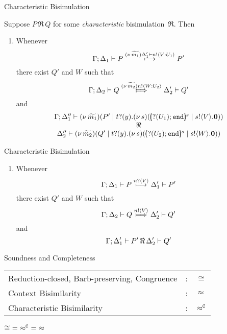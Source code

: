 \documentclass{beamer}
\begin{document}
	\begin{frame}{Characteristic Bisimulation}

		Suppose $P\, \Re\, Q$ for some {\em characteristic} bisimulation~$\Re$. Then
		\begin{enumerate}[$(\star)$]
			\item	Whenever
				\[
					\Gamma; \Delta_1 \vdash P \stackrel{(\nu\, \widetilde{m_1}) \Delta_1' \vdash n ! \langle V: U_1 \rangle}{\longmapsto} P'
				\]
				there exist $Q'$ and $W$ such that 
				\[
					\Gamma; \Delta_2 \proves Q \Hby{\news{\widetilde{m_2}} \bactout{n}{W: U_2}} \Delta_2' \proves Q'
				\]
				and
				\[
					\begin{array}{c}
						\Gamma; \Delta_1'' \proves \newsp{\widetilde{m_1}}{P' \Par \binp{t}{y}\newsp{s}{\mapchar{\btinp{U_1} \tinact}{s} \Par \bout{s}{V} \inact}}
						\\
						\Re
						\\
						\Delta_2'' \proves \newsp{\widetilde{m_2}}{Q' \Par \binp{t}{y}\newsp{s}{\mapchar{\btinp{U_2} \tinact}{s} \Par \bout{s}{W} \inact}}
					\end{array}
				\]
		\end{enumerate}
	\end{frame}

	\begin{frame}{Characteristic Bisimulation}
		\begin{enumerate}[$(\star)$]
			\item	Whenever
				\[
					\Gamma; \Delta_1 \vdash P \stackrel{n ? \langle V \rangle}{\longmapsto} \Delta_1' \vdash P'
				\]
				there exist $Q'$ and $W$ such that 
				\[
					\Gamma; \Delta_2 \proves Q \Hby{\bactout{n}{V}} \Delta_2' \proves Q'
				\]
				and
				\[
					\Gamma; \Delta_1' \vdash P'\, \Re\, \Delta_2' \vdash Q'
				\]
		\end{enumerate}
	\end{frame}

	\begin{frame}{Soundness and Completeness}
		\begin{tabular}{lcc}
			Reduction-closed, Barb-preserving, Congruence&: & $\cong$\\
			Context Bisimilarity&: & $\approx$\\
			Characteristic Bisimilarity&: & $\approx^\mathtt{C}$
		\end{tabular}

		\begin{theorem}
			$\cong\ =\ \approx^\mathtt{C}\ =\ \approx$
		\end{theorem}
	\end{frame}
\end{document}
